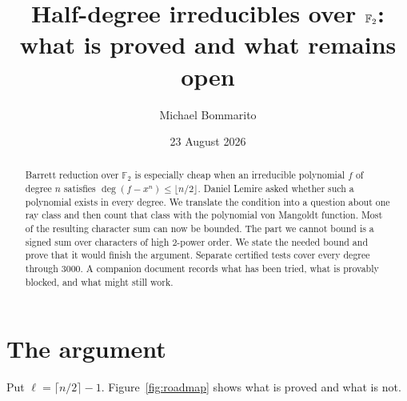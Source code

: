 \documentclass[10pt]{article}
\title{\vspace{-2.2em}Half-degree irreducibles over $\F_2$:\\what is proved and what remains open}
\author{Michael Bommarito}
\date{23 August 2026}
\newcommand{\F}{\mathbb F}
\begin{document}
\maketitle
\vspace{-1.8em}
\begin{center}
\end{center}
\vspace{-0.5em}

\begin{abstract}
Barrett reduction over $\F_2$ is especially cheap when an irreducible
polynomial $f$ of degree $n$ satisfies
$\deg(f-x^n)\leq\lfloor n/2\rfloor$.  Daniel Lemire asked whether such a
polynomial exists in every degree. We translate the condition into a question about
one ray class and then count that class with the polynomial von Mangoldt
function. Most of the resulting character sum can now be bounded. The part
we cannot bound is a signed sum over characters of high $2$-power order. We
state the needed bound and prove that it would finish the argument. Separate
certified tests cover every degree through 3000. A companion document records
what has been tried, what is provably blocked, and what might still work.
\end{abstract}

\section{The argument}

Put $\ell=\lceil n/2\rceil-1$. Figure~\ref{fig:roadmap} shows what is proved
and what is not.
\end{document}
